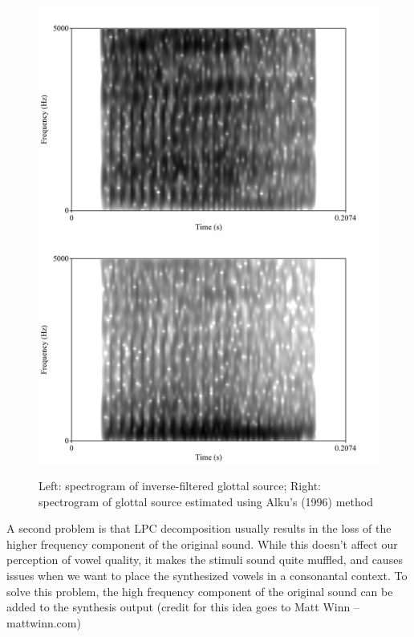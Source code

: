 \documentclass{article}\usepackage[]{graphicx}\usepackage[]{color}
\begin{document}
\begin{figure}[!ht]
\includegraphics[scale=0.4,keepaspectratio]{not_very_white.png}
\includegraphics[scale=0.4,keepaspectratio]{much_more_white.png}
\caption{Left: spectrogram of inverse-filtered glottal source; Right: spectrogram of glottal source estimated using Alku's (1996) method}
\end{figure}

A second problem is that LPC decomposition usually results in the loss of the higher frequency component of the original sound. While this doesn't affect our perception of vowel quality, it makes the stimuli sound quite muffled, and causes issues when we want to place the synthesized vowels in a consonantal context. To solve this problem, the high frequency component of the original sound can be added to the synthesis output (credit for this idea goes to Matt Winn -- mattwinn.com)
\end{document}
